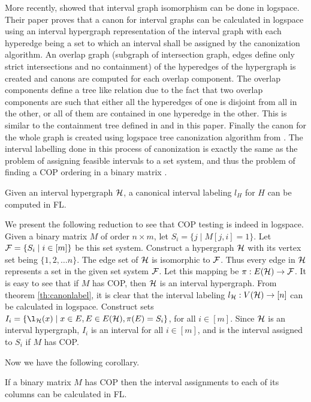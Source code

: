 \noindent
More recently, \cite{kklv10} showed that interval graph isomorphism
can be done in logspace. Their paper proves that a canon for interval
graphs can be calculated in logspace using an interval hypergraph
representation of the interval graph with each hyperedge being a set
to which an interval shall be assigned by the canonization
algorithm. An overlap graph (subgraph of intersection graph, edges
define only strict intersections and no containment) of the hyperedges
of the hypergraph is created and canons are computed for each overlap
component. The overlap components define a tree like relation due to
the fact that two overlap components are such that either all the
hyperedges of one is disjoint from all in the other, or all of them
are contained in one hyperedge in the other. This is similar to the
containment tree defined in \cite{nsnrs09} and in this paper. Finally
the canon for the whole graph is created using logspace tree
canonization algorithm from \cite{sl92}. The interval labelling done
in this process of canonization is exactly the same as the problem of
assigning feasible intervals to a set system, and thus the problem of
finding a COP ordering in a binary matrix \cite{nsnrs09}.

\begin{theorem}
  \label{th:canonlabel}
  Given an interval hypergraph ${\cal H}$, a canonical interval labeling
  $l_H$ for $H$ can be computed in FL.
\end{theorem}


We present the following reduction to see that COP testing is indeed
in logspace. Given a binary matrix $M$ of order $n \times m$, let $S_i
= \{j \mid M[j,i]=1 \}$. Let ${\cal F} = \{S_i \mid i \in [m] \}$ be this
set system. Construct a hypergraph ${\cal H}$ with its vertex set being
$\{1, 2, \dots n\}$. The edge set of ${\cal H}$ is isomorphic to
${\cal F}$. Thus every edge in ${\cal H}$ represents a set in the given set
system ${\cal F}$. Let this mapping be $\pi: E({\cal H}) \rightarrow {\cal F}$. It is
easy to see that if $M$ has COP, then ${\cal H}$ is an interval
hypergraph. From theorem \ref{th:canonlabel}, it is clear that the
interval labeling $l_{{\cal H}}: V({\cal H}) \rightarrow [n]$ can be calculated
in logspace. Construct sets $I_i = \{ \l_{\cH}(x) \mid x \in E, E \in
E(\cH), \pi(E) = S_i\}$, for all $i \in [m]$. Since ${\cal H}$ is an
interval hypergraph, $I_i$ is an interval for all $i \in [m]$, and is
the interval assigned to $S_i$ if $M$ has COP.

Now we have the following corollary.
\begin{corollary}
  \label{cor:coplog}
  If a binary matrix $M$ has COP then the interval assignments to each
  of its columns can be calculated in FL.
\end{corollary}

